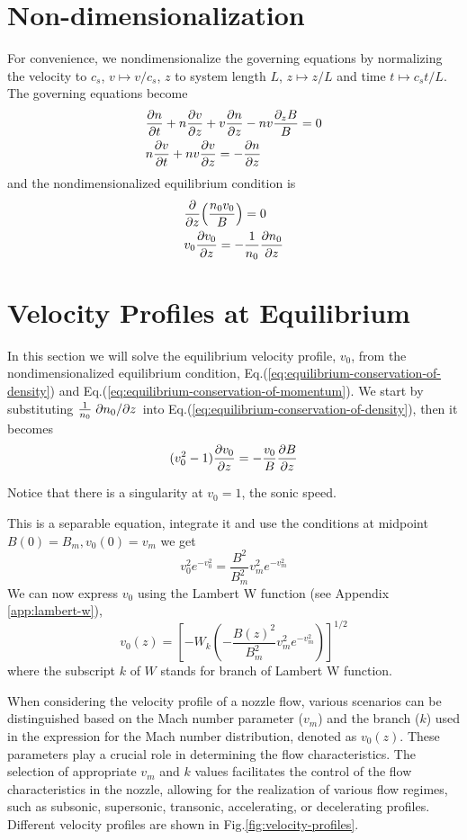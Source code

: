 \section{Non-dimensionalization}
For convenience, we nondimensionalize the governing equations by normalizing the velocity to $c_s$, $v\mapsto v/c_s$, $z$ to system length $L$, $z \mapsto z/L$ and time $t\mapsto c_s t/L$. The governing equations become
\begin{align}
	 & \pdv{n}{t} + n\pdv{v}{z} + v\pdv{n}{z} - nv\frac{\partial_z B}{B} = 0
	\label{eq:conservation-of-density}
	\\
	 & n\pdv{v}{t} + nv\pdv{v}{z} = -\pdv{n}{z}
	\label{eq:conservation-of-momentum}
\end{align}
and the nondimensionalized equilibrium condition is
\begin{align}
	 & \pdv{z}(\frac{n_0v_0}{B}) = 0 \label{eq:equilibrium-conservation-of-density}                 \\
	 & v_0\pdv{v_0}{z} = -\frac{1}{n_0}\pdv{n_0}{z} \label{eq:equilibrium-conservation-of-momentum}
\end{align}

\section{Velocity Profiles at Equilibrium}
In this section we will solve the equilibrium velocity profile, $v_0$, from the nondimensionalized equilibrium condition, Eq.(\ref{eq:equilibrium-conservation-of-density}) and Eq.(\ref{eq:equilibrium-conservation-of-momentum}).
We start by substituting $\frac{1}{n_0}\pdv*{n_0}{z}$ into Eq.(\ref{eq:equilibrium-conservation-of-density}), then it becomes
\[ (v_0^2-1)\pdv{v_0}{z} = -\frac{v_0}{B}\pdv{B}{z} \]

Notice that there is a singularity at $v_0=1$, the sonic speed.

This is a separable equation, integrate it and use the conditions at midpoint $B(0)=B_m, v_0(0)=v_m$ we get
\[ v_0^2e^{-v_0^2} = \frac{B^2}{B_m^2}v_m^2e^{-v_m^2} \]
We can now express $v_0$ using the Lambert W function (see Appendix \ref{app:lambert-w}),
\begin{equation}
	v_0(z) = \left[ -W_k\left(-\frac{B(z)^2}{B_m^2}v_m^2e^{-v_m^2}\right) \right]^{1/2}
	\label{eq:velocity-profile}
\end{equation}
where the subscript $k$ of $W$ stands for branch of Lambert W function.

When considering the velocity profile of a nozzle flow, various scenarios can be distinguished based on the Mach number parameter ($v_m$) and the branch ($k$) used in the expression for the Mach number distribution, denoted as $v_0(z)$. These parameters play a crucial role in determining the flow characteristics. The selection of appropriate $v_m$ and $k$ values facilitates the control of the flow characteristics in the nozzle, allowing for the realization of various flow regimes, such as subsonic, supersonic, transonic, accelerating, or decelerating profiles. Different velocity profiles are shown in Fig.\ref{fig:velocity-profiles}.

